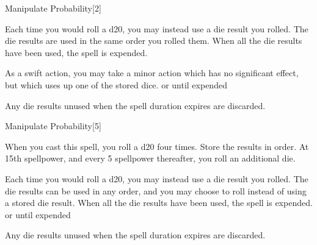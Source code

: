 \begin{spellfooter}
\begin{spellsection}[Lesser]{Manipulate Probability}[2]
\begin{spellcontent}
\begin{spelleffects}
            Each time you would roll a d20, you may instead use a die result you rolled. The die results are used in the same order you rolled them. When all the die results have been used, the spell is expended.

            As a swift action, you may take a minor action which has no significant effect, but which uses up one of the stored dice.
            \spelldur \durshort or until expended
        \end{spelleffects}
    \end{spellcontent}
    \begin{spellfooter}
        \spellnotes Any die results unused when the spell duration expires are discarded.
        \miscastexplode
    \end{spellfooter}
\end{spellsection}

\begin{spellsection}{Manipulate Probability}[5]
    \begin{spellheader}
    \end{spellheader}
    \begin{spellcontent}
        \begin{spelltargetinginfo}
        \end{spelltargetinginfo}
        \begin{spelleffects}
            \spelleffect When you cast this spell, you roll a d20 four times. Store the results in order. At 15th spellpower, and every 5 spellpower thereafter, you roll an additional die.

            Each time you would roll a d20, you may instead use a die result you rolled. The die results can be used in any order, and you may choose to roll instead of using a stored die result. When all the die results have been used, the spell is expended.
            \spelldur \durshort or until expended
        \end{spelleffects}
    \end{spellcontent}
    \begin{spellfooter}
        \spellnotes Any die results unused when the spell duration expires are discarded.
        \miscastexplode
    \end{spellfooter}
\end{spellsection}



\end{spellfooter}

